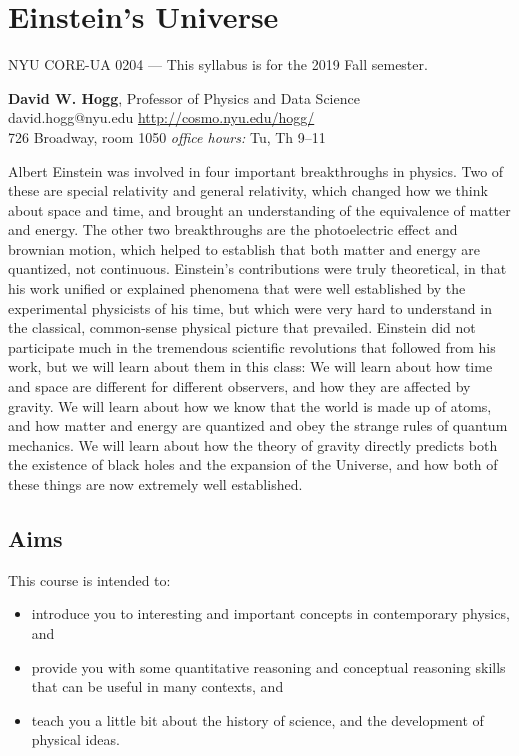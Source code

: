 \documentclass[12pt]{article}
\begin{document}
\sloppy\sloppypar\raggedbottom\frenchspacing

\section*{Einstein's Universe}
NYU CORE-UA 0204 --- This syllabus is for the 2019 Fall semester.

\bigskip
\noindent
\textbf{David W. Hogg}, Professor of Physics and Data Science \\
david.hogg@nyu.edu \hfill \url{http://cosmo.nyu.edu/hogg/} \\
726 Broadway, room 1050 \hfill \textsl{office hours:} Tu, Th 9--11

\bigskip
\noindent
Albert Einstein was involved in four important breakthroughs in
physics.
Two of these are special relativity and general relativity, which
changed how we think about space and time, and brought an
understanding of the equivalence of matter and energy.
The other two breakthroughs are the photoelectric effect and brownian
motion, which helped to establish that both matter and energy are quantized,
not continuous.
Einstein's contributions were truly theoretical, in that his work
unified or explained phenomena that were well established by the
experimental physicists of his time, but which were very hard to
understand in the classical, common-sense physical picture that
prevailed.
Einstein did not participate much in the tremendous scientific
revolutions that followed from his work, but we will learn about
them in this class:
We will learn about how time and space are different for different
observers, and how they are affected by gravity.
We will learn about how we know that the world is made up of atoms,
and how matter and energy are quantized and obey the strange rules of
quantum mechanics.
We will learn about how the theory of gravity directly predicts both
the existence of black holes and the expansion of the Universe, and
how both of these things are now extremely well established.

\subsection*{Aims}

This course is intended to:
\begin{itemize}
\item
introduce you to interesting and important concepts in contemporary
physics, and
\item
provide you with some quantitative reasoning and conceptual
reasoning skills that can be useful in many contexts, and
\item
teach you a little bit about the history of science,
and the development of physical ideas.
\end{itemize}
\end{document}
